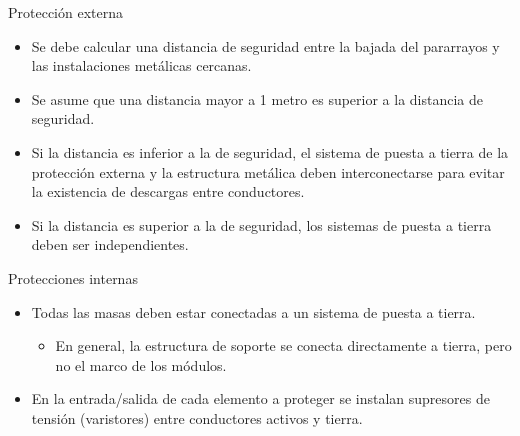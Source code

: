 \documentclass[xcolor={usenames,svgnames,dvipsnames}]{beamer}
\begin{document}
\begin{frame}[label={sec:orgfe140ff}]{Protección externa}
\begin{itemize}
\item Se debe calcular una \alert{distancia de seguridad} entre la bajada del
pararrayos y las instalaciones metálicas cercanas.

\item Se asume que una distancia mayor a 1 metro es superior a la distancia
de seguridad.

\item \alert{Si la distancia es inferior a la de seguridad}, el sistema de puesta
a tierra de la protección externa y la estructura metálica deben
\alert{interconectarse} para evitar la existencia de descargas entre
conductores.

\item \alert{Si la distancia es superior a la de seguridad}, los sistemas de
puesta a tierra deben ser \alert{independientes}.
\end{itemize}
\end{frame}

\begin{frame}[label={sec:org141fe5d}]{Protecciones internas}
\begin{itemize}
\item \alert{Todas las masas deben estar conectadas a un sistema de puesta a
tierra}.

\begin{itemize}
\item En general, la estructura de soporte se conecta directamente
a tierra, pero no el marco de los módulos.
\end{itemize}

\item En la entrada/salida de cada elemento a proteger se instalan
\alert{supresores de tensión (varistores)} entre conductores activos y
tierra.
\end{itemize}
\end{frame}
\end{document}
